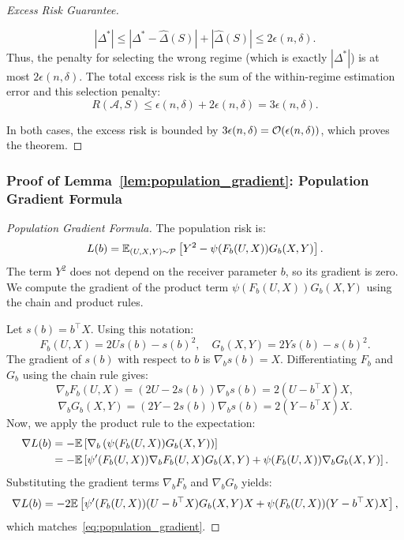 \begin{proof}[Excess Risk Guarantee]
\begin{enumerate}
\begin{equation}
        |\Delta^*| \le |\Delta^* - \hat{\Delta}(S)| + |\hat{\Delta}(S)| \le 2\epsilon(n, \delta).
    \end{equation}
    Thus, the penalty for selecting the wrong regime (which is exactly $|\Delta^*|$) is at most $2\epsilon(n, \delta)$. The total excess risk is the sum of the within-regime estimation error and this selection penalty:
    \begin{equation}
        R(\mathcal{A}, S) \le \epsilon(n, \delta) + 2\epsilon(n, \delta) = 3\epsilon(n, \delta).
    \end{equation}
\end{enumerate}
In both cases, the excess risk is bounded by $3\epsilon(n, \delta) = \mathcal{O}(\epsilon(n, \delta))$, which proves the theorem.
\end{proof}

\subsubsection*{Proof of Lemma~\ref{lem:population_gradient}: Population Gradient Formula}
\label{app:proof_population_gradient}
\begin{proof}[Population Gradient Formula]
The population risk is:
\begin{equation}
    L(b) = \mathbb{E}_{(U,X,Y) \sim \mathcal{P}}\left[ Y^2 - \psi(F_b(U, X)) G_b(X, Y) \right].
\end{equation}
The term $Y^2$ does not depend on the receiver parameter $b$, so its gradient is zero. We compute the gradient of the product term $\psi(F_b(U, X)) G_b(X, Y)$ using the chain and product rules.

Let $s(b) = b^\top X$. Using this notation:
\begin{equation}
    F_b(U, X) = 2Us(b) - s(b)^2, \quad G_b(X, Y) = 2Ys(b) - s(b)^2.
\end{equation}
The gradient of $s(b)$ with respect to $b$ is $\nabla_b s(b) = X$. 
Differentiating $F_b$ and $G_b$ using the chain rule gives:
\begin{equation}
    \nabla_b F_b(U, X) = (2U - 2s(b))\nabla_b s(b) = 2(U - b^\top X)X,
\end{equation}
\begin{equation}
    \nabla_b G_b(X, Y) = (2Y - 2s(b))\nabla_b s(b) = 2(Y - b^\top X)X.
\end{equation}
Now, we apply the product rule to the expectation:
\begin{align}
    \nabla L(b) &= -\mathbb{E}\left[ \nabla_b \left( \psi(F_b(U, X)) G_b(X, Y) \right) \right] \nonumber \\
    &= -\mathbb{E}\left[ \psi'(F_b(U, X))\nabla_b F_b(U, X) G_b(X, Y) + \psi(F_b(U, X)) \nabla_b G_b(X, Y) \right].
\end{align}
Substituting the gradient terms $\nabla_b F_b$ and $\nabla_b G_b$ yields:
\begin{equation}
    \nabla L(b) = -2 \mathbb{E}\left[ \psi'(F_b(U, X))(U - b^\top X) G_b(X, Y) X + \psi(F_b(U, X))(Y - b^\top X) X \right],
\end{equation}
which matches~\eqref{eq:population_gradient}.
\end{proof}


